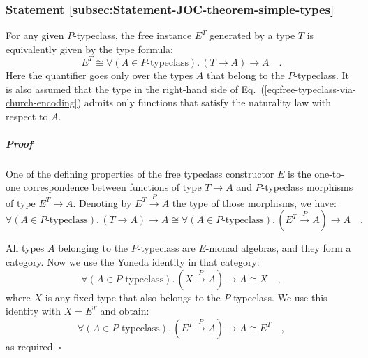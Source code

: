 \subsubsection{Statement \label{subsec:Statement-JOC-theorem-simple-types}\ref{subsec:Statement-JOC-theorem-simple-types}}

For any given $P$-typeclass, the free instance $E^{T}$ generated
by a type $T$ is equivalently given by the type formula:
\begin{equation}
E^{T}\cong\forall(A\in P\text{-typeclass}).\,(T\rightarrow A)\rightarrow A\quad.\label{eq:free-typeclass-via-church-encoding}
\end{equation}
Here the quantifier goes only over the types $A$ that belong to the
$P$-typeclass. It is also assumed that the type in the right-hand
side of Eq.~(\ref{eq:free-typeclass-via-church-encoding}) admits
only functions that satisfy the naturality law with respect to $A$.

\subparagraph{Proof}

One of the defining properties of the free typeclass constructor $E$
is the one-to-one correspondence between functions of type $T\rightarrow A$
and $P$-typeclass morphisms of type $E^{T}\rightarrow A$. Denoting
by $E^{T}\overset{P}{\rightarrow}A$ the type of those morphisms,
we have:
\[
\forall(A\in P\text{-typeclass}).\,(T\rightarrow A)\rightarrow A\cong\forall(A\in P\text{-typeclass}).\,(E^{T}\overset{P}{\rightarrow}A)\rightarrow A\quad.
\]

All types $A$ belonging to the $P$-typeclass are $E$-monad algebras,
and they form a category. Now we use the Yoneda identity in that category:
\[
\forall(A\in P\text{-typeclass}).\,(X\overset{P}{\rightarrow}A)\rightarrow A\cong X\quad,
\]
where $X$ is any fixed type that also belongs to the $P$-typeclass.
We use this identity with $X=E^{T}$ and obtain:
\[
\forall(A\in P\text{-typeclass}).\,(E^{T}\overset{P}{\rightarrow}A)\rightarrow A\cong E^{T}\quad,
\]
as required. $\square$

